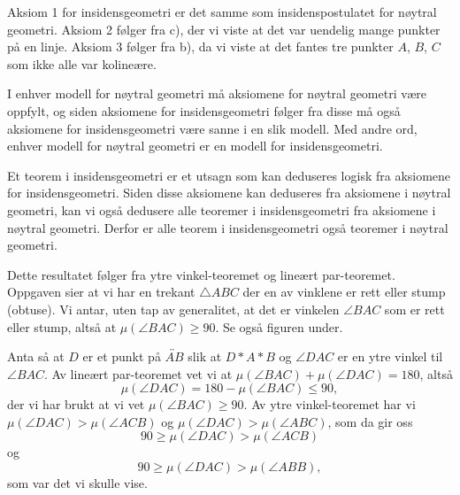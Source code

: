 \begin{oppgave}[3.7.2]
\begin{punkt}
    Aksiom 1 for insidensgeometri er det samme som insidenspostulatet for nøytral geometri. 
    Aksiom 2 følger fra c), der vi viste at det var uendelig mange punkter på en linje.
    Aksiom 3 følger fra b), da vi viste at det fantes tre punkter $A$, $B$, $C$ som ikke alle var kolineære.
    
    I enhver modell for nøytral geometri må aksiomene for nøytral geometri være oppfylt, og siden aksiomene for insidensgeometri følger fra disse må også aksiomene for insidensgeometri være sanne i en slik modell. 
    Med andre ord, enhver modell for nøytral geometri er en modell for insidensgeometri.
\end{punkt}

\begin{punkt}
    Et teorem i insidensgeometri er et utsagn som kan deduseres logisk fra aksiomene for insidensgeometri. 
    Siden disse aksiomene kan deduseres fra aksiomene i nøytral geometri, kan vi også dedusere alle teoremer i insidensgeometri fra aksiomene i nøytral geometri. 
    Derfor er alle teorem i insidensgeometri også teoremer i nøytral geometri. 
\end{punkt}
\end{oppgave}

\begin{oppgave}[4.1.1]
    Dette resultatet følger fra ytre vinkel-teoremet og lineært par-teoremet.
    Oppgaven sier at vi har en trekant $\triangle ABC$ der en av vinklene er rett eller stump (obtuse).
    Vi antar, uten tap av generalitet, at det er vinkelen $\angle BAC$ som er rett eller stump, altså at $\mu(\angle BAC)\geq 90$. 
    Se også figuren under. 

    Anta så at $D$ er et punkt på $\overleftrightarrow{AB}$ slik at $D\ast A\ast B$ og $\angle DAC$ er en ytre vinkel til $\angle BAC$.
    Av lineært par-teoremet vet vi at $\mu(\angle BAC)+\mu(\angle DAC) = 180$, altså $$ \mu(\angle DAC) = 180-\mu(\angle BAC) \leq 90,$$ der vi har brukt at vi vet $\mu(\angle BAC)\geq 90$. 
    Av ytre vinkel-teoremet har vi $\mu(\angle DAC)>\mu(\angle ACB)$ og $\mu(\angle DAC)>\mu(\angle ABC)$, som da gir oss 
    $$90\geq \mu(\angle DAC)>\mu(\angle ACB)$$ og 
    $$90\geq \mu(\angle DAC)>\mu(\angle ABB),$$
    som var det vi skulle vise. 

    \begin{figure}[H]
        \centering
        
    \end{figure}
\end{oppgave}

